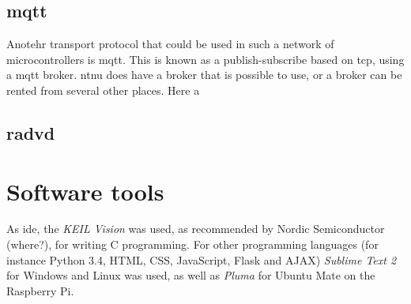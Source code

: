 \subsection{\gls{mqtt}}

Anotehr transport protocol that could be used in such a network of microcontrollers is \gls{mqtt}. This is  known as a publish-subscribe based on \gls{tcp}, using a \gls{mqtt} broker. \gls{ntnu} does have a broker that is possible to use, or a broker can be rented from several other places. Here a 

\cite{hunkeler2008mqtt}

\subsection{\gls{radvd}}

\section{Software tools}

As \gls{ide}, the \textit{KEIL Vision} was used, as recommended by Nordic Semiconductor (where?), for writing C programming. For other programming languages (for instance Python 3.4, HTML, CSS, JavaScript, Flask and AJAX) \textit{Sublime Text 2} for Windows and Linux was used, as well as \textit{Pluma} for Ubuntu Mate on the Raspberry Pi. 






